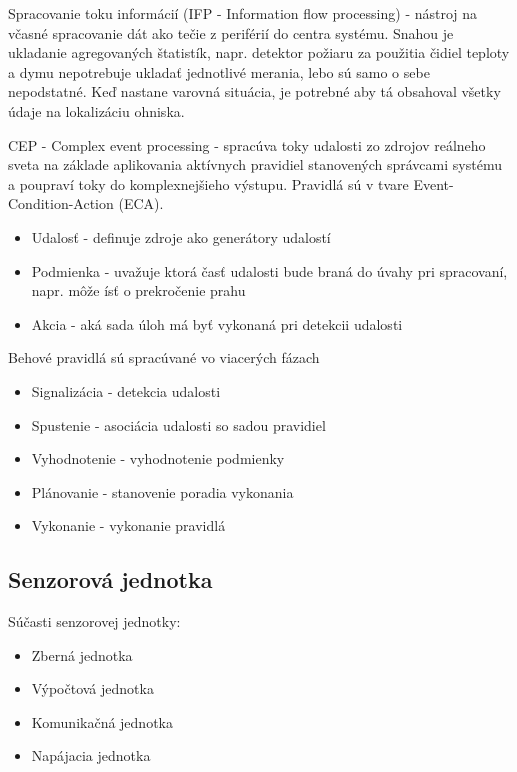 Spracovanie toku informácií (IFP - Information flow processing) - nástroj na včasné spracovanie dát ako tečie z periférií do centra systému. Snahou je ukladanie agregovaných štatistík, napr. detektor požiaru za použitia čidiel teploty a dymu nepotrebuje ukladať jednotlivé merania, lebo sú samo o sebe nepodstatné. Keď nastane varovná situácia, je potrebné aby tá obsahoval všetky údaje na lokalizáciu ohniska.

CEP - Complex event processing - spracúva toky udalosti zo zdrojov reálneho sveta na základe aplikovania aktívnych pravidiel stanovených správcami systému a poupraví toky do komplexnejšieho výstupu. Pravidlá sú v tvare Event-Condition-Action (ECA).
\begin{itemize}
\itemsep0em
\item Udalosť - definuje zdroje ako generátory udalostí
\item Podmienka - uvažuje ktorá časť udalosti bude braná do úvahy pri spracovaní, napr. môže ísť o prekročenie prahu
\item Akcia - aká sada úloh má byť vykonaná pri detekcii udalosti
\end{itemize}

Behové pravidlá sú spracúvané vo viacerých fázach
\begin{itemize}
\item Signalizácia - detekcia udalosti
\item Spustenie - asociácia udalosti so sadou pravidiel
\item Vyhodnotenie - vyhodnotenie podmienky
\item Plánovanie - stanovenie poradia vykonania
\item Vykonanie - vykonanie pravidlá
\end{itemize}
\cite{processing-information-flows}

\subsection{Senzorová jednotka}

Súčasti senzorovej jednotky:
\begin{itemize}
\item Zberná jednotka
\item Výpočtová jednotka
\item Komunikačná jednotka
\item Napájacia jednotka
\end{itemize}

